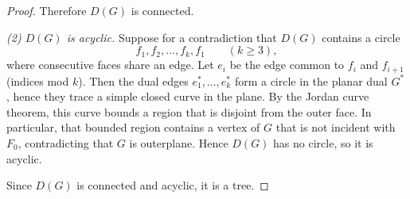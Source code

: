 \documentclass[12pt]{amsart}
\theoremstyle{theorem}%
\theoremstyle{definition}%
\begin{document}
\begin{proof}
Therefore $D(G)$ is connected.

\smallskip
\noindent\emph{(2) $D(G)$ is acyclic.}
Suppose for a contradiction that $D(G)$ contains a circle
\[
f_1,f_2,\dots,f_k,f_1\qquad (k\ge 3),
\]
where consecutive faces share an edge. Let $e_i$ be the edge common to $f_i$ and $f_{i+1}$ (indices mod $k$).
Then the dual edges $e_1^*,\dots,e_k^*$ form a circle in the planar dual $G^*$, hence they trace a simple closed
curve in the plane. By the Jordan curve theorem, this curve bounds a region that is disjoint from the outer face.
In particular, that bounded region contains a vertex of $G$ that is not incident with $F_0$, contradicting that
$G$ is outerplane. Hence $D(G)$ has no circle, so it is acyclic.

\smallskip
Since $D(G)$ is connected and acyclic, it is a tree.
\end{proof}
\end{document}
